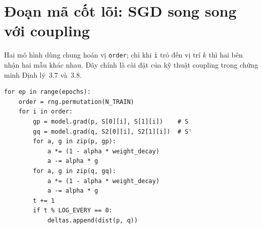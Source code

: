 \section{Đoạn mã cốt lõi: SGD song song với coupling}

Hai mô hình dùng chung hoán vị \texttt{order}; chỉ khi \texttt{i} trỏ đến vị trí $k$ thì hai bên nhận hai mẫu khác nhau. Đây chính là cài đặt của kỹ thuật coupling trong chứng minh Định lý~3.7 và~3.8.

\begin{verbatim}
for ep in range(epochs):
    order = rng.permutation(N_TRAIN)
    for i in order:
        gp = model.grad(p, S[0][i], S[1][i])    # S
        gq = model.grad(q, S2[0][i], S2[1][i])  # S'
        for a, g in zip(p, gp):
            a *= (1 - alpha * weight_decay)
            a -= alpha * g
        for a, g in zip(q, gq):
            a *= (1 - alpha * weight_decay)
            a -= alpha * g
        t += 1
        if t % LOG_EVERY == 0:
            deltas.append(dist(p, q))
\end{verbatim}
